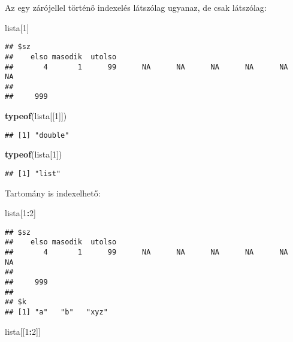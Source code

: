 \documentclass[]{book}
\newenvironment{Shaded}{\begin{snugshade}}{\end{snugshade}}
\newcommand{\KeywordTok}[1]{\textcolor[rgb]{0.13,0.29,0.53}{\textbf{#1}}}
\newcommand{\DecValTok}[1]{\textcolor[rgb]{0.00,0.00,0.81}{#1}}
\newcommand{\OperatorTok}[1]{\textcolor[rgb]{0.81,0.36,0.00}{\textbf{#1}}}
\newcommand{\NormalTok}[1]{#1}
\begin{document}
Az egy zárójellel történő indexelés látszólag ugyanaz, de csak
látszólag:

\begin{Shaded}
\begin{Highlighting}[]
\NormalTok{lista[}\DecValTok{1}\NormalTok{]}
\end{Highlighting}
\end{Shaded}

\begin{verbatim}
## $sz
##    elso masodik  utolso                                                 
##       4       1      99      NA      NA      NA      NA      NA      NA 
##         
##     999
\end{verbatim}

\begin{Shaded}
\begin{Highlighting}[]
\KeywordTok{typeof}\NormalTok{(lista[[}\DecValTok{1}\NormalTok{]])}
\end{Highlighting}
\end{Shaded}

\begin{verbatim}
## [1] "double"
\end{verbatim}

\begin{Shaded}
\begin{Highlighting}[]
\KeywordTok{typeof}\NormalTok{(lista[}\DecValTok{1}\NormalTok{])}
\end{Highlighting}
\end{Shaded}

\begin{verbatim}
## [1] "list"
\end{verbatim}

Tartomány is indexelhető:

\begin{Shaded}
\begin{Highlighting}[]
\NormalTok{lista[}\DecValTok{1}\OperatorTok{:}\DecValTok{2}\NormalTok{]}
\end{Highlighting}
\end{Shaded}

\begin{verbatim}
## $sz
##    elso masodik  utolso                                                 
##       4       1      99      NA      NA      NA      NA      NA      NA 
##         
##     999 
## 
## $k
## [1] "a"   "b"   "xyz"
\end{verbatim}

\begin{Shaded}
\begin{Highlighting}[]
\NormalTok{lista[[}\DecValTok{1}\OperatorTok{:}\DecValTok{2}\NormalTok{]]}
\end{Highlighting}
\end{Shaded}
\end{document}

